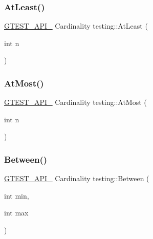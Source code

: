 \mbox{\label{namespacetesting_a137297cb3c582843989fbd937cf0fed2}} 
\subsubsection{\texorpdfstring{AtLeast()}{AtLeast()}}
{\footnotesize\ttfamily \mbox{\hyperlink{_obj__test_2lib_2googletest-release-1_88_81_2googletest_2include_2gtest_2internal_2gtest-port_8h_aa73be6f0ba4a7456180a94904ce17790}{G\+T\+E\+S\+T\+\_\+\+A\+P\+I\+\_\+}} Cardinality testing\+::\+At\+Least (\begin{DoxyParamCaption}\item[{int}]{n }\end{DoxyParamCaption})}

\mbox{\label{namespacetesting_a5487cd1068c78821ced96fbf542a91bb}} 
\subsubsection{\texorpdfstring{AtMost()}{AtMost()}}
{\footnotesize\ttfamily \mbox{\hyperlink{_obj__test_2lib_2googletest-release-1_88_81_2googletest_2include_2gtest_2internal_2gtest-port_8h_aa73be6f0ba4a7456180a94904ce17790}{G\+T\+E\+S\+T\+\_\+\+A\+P\+I\+\_\+}} Cardinality testing\+::\+At\+Most (\begin{DoxyParamCaption}\item[{int}]{n }\end{DoxyParamCaption})}

\mbox{\label{namespacetesting_a3bb2d3cdd3fdf5b4be1480fce549918e}} 
\subsubsection{\texorpdfstring{Between()}{Between()}}
{\footnotesize\ttfamily \mbox{\hyperlink{_obj__test_2lib_2googletest-release-1_88_81_2googletest_2include_2gtest_2internal_2gtest-port_8h_aa73be6f0ba4a7456180a94904ce17790}{G\+T\+E\+S\+T\+\_\+\+A\+P\+I\+\_\+}} Cardinality testing\+::\+Between (\begin{DoxyParamCaption}\item[{int}]{min,  }\item[{int}]{max }\end{DoxyParamCaption})}

